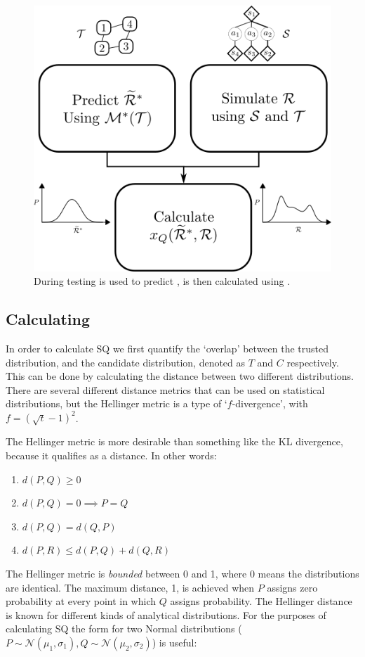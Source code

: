\begin{figure}[tbp]
    \centering
    \includegraphics[width=0.6\linewidth]{Figures/SQ_test.png}
    \caption{During testing \surrogate{} is used to predict \rwdstarapprox{}, \xQ{} is then calculated using \rwd{}.}
    \label{fig:sq_test}
\end{figure}

\subsection{Calculating \xQ}
In order to calculate SQ we first quantify the `overlap' between the trusted distribution, and the candidate distribution, denoted as $T$ and $C$ respectively. This can be done by calculating the distance between two different distributions. There are several different distance metrics that can be used on statistical distributions, but the Hellinger metric is a type of `$f$-divergence', with $f=(\sqrt{t}-1)^2$.

The Hellinger metric is more desirable than something like the KL divergence, because it qualifies as a distance. In other words:

\begin{enumerate}
    \item $d(P,Q) \geq 0$
    \item $d(P,Q) = 0 \implies P=Q$
    \item $d(P,Q) = d(Q,P)$
    \item $d(P,R) \leq d(P,Q) + d(Q,R)$
\end{enumerate}

The Hellinger metric is \emph{bounded} between 0 and 1, where 0 means the distributions are identical. The maximum distance, 1, is achieved when $P$ assigns zero probability at every point in which $Q$ assigns probability. The Hellinger distance is known for different kinds of analytical distributions. For the purposes of calculating SQ the form for two Normal distributions ($P \sim \mathcal{N}(\mu_1,\sigma_1), Q\sim\mathcal{N}(\mu_2,\sigma_2)$) is useful:

